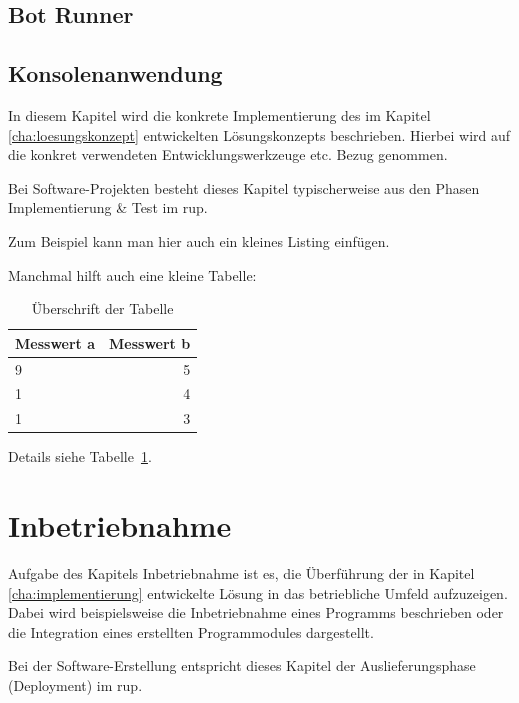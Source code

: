 \documentclass[oneside]{ausarbeitung}
\begin{document}

\section{Bot Runner}
\label{sec:bot_runner}


\section{Konsolenanwendung}
\label{sec:konsolenanwendung}


In diesem Kapitel wird die konkrete Implementierung des im Kapitel
\ref{cha:loesungskonzept} entwickelten Lösungskonzepts beschrieben.
Hierbei wird auf die konkret verwendeten Entwicklungswerkzeuge etc. 
Bezug genommen.

Bei Software-Projekten besteht dieses Kapitel typischerweise aus den 
Phasen Implementierung \& Test im \ac{rup}.

Zum Beispiel kann man hier auch ein kleines Listing einfügen.

Manchmal hilft auch eine kleine Tabelle:

\begin{table}[htbp]
\centering
\begin{tabular}{|l|r|}
\hline
\textbf{Messwert a} & \textbf{Messwert b} \\ \hline
9 & 5 \\ \hline
1 & 4 \\ \hline
1 & 3 \\ \hline
\end{tabular}
\caption{Überschrift der Tabelle}
\label{tab:my-table}
\end{table}

Details siehe Tabelle~\ref{tab:my-table}.

\chapter{Inbetriebnahme}
\label{cha:inbetriebnahme}

Aufgabe des Kapitels Inbetriebnahme ist es, die Überführung der in 
Kapitel \ref{cha:implementierung} entwickelte Lösung in das betriebliche 
Umfeld aufzuzeigen. Dabei wird beispielsweise die Inbetriebnahme eines 
Programms beschrieben oder die Integration eines erstellten 
Programmodules dargestellt.

Bei der Software-Erstellung entspricht dieses Kapitel der 
Auslieferungsphase (Deployment) im \ac{rup}.
\end{document}
